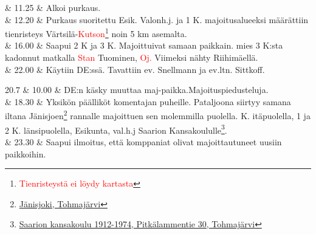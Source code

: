 \documentclass[11pt,a5paper,oneside]{book}
\begin{document}
& 11.25 & Alkoi purkaus. \\

& 12.20 & Purkaus suoritettu \newline Esik. Valonh.j. ja 1 K. majoitusalueeksi määrättiin tienristeys Värtsilä-\textcolor{red}{Kutson}\footnote{\textcolor{red}{Tienristeystä ei löydy kartasta}} noin 5 km asemalta. \\

& 16.00 & Saapui 2 K ja 3 K. Majoittuivat samaan paikkain. mies 3 K:sta kadonnut matkalla \textcolor{red}{Stan} Tuominen, \textcolor{red}{Oj.} Viimeksi nähty Riihimäellä. \newline\newline \\

& 22.00 & Käytiin DE:ssä. Tavattiin ev. Snellmann ja ev.ltn. Sittkoff. \\
\newpage

20.7 & 10.00 & DE:n käsky muuttaa maj-paikka.\newline Majoituspiedusteluja. \newline \\

& 18.30 & Yksikön päälliköt komentajan puheille. Pataljoona siirtyy samana iltana Jänisjoen\footnote{\href{https://www.google.fi/maps/place/J\%C3\%A4nisjoki/@62.1921584,30.5864508,14z/}{Jänisjoki, Tohmajärvi}} rannalle majoittuen sen molemmilla puolella. K. itäpuolella, 1 ja 2 K. länsipuolella, Esikunta, val.h.j Saarion Kansakoululle\footnote{\href{https://www.google.fi/maps/place/Pitk\%C3\%A4lammentie+30,+82600+Tohmaj\%C3\%A4rvi/}{Saarion kansakoulu 1912-1974, Pitkälammentie 30, Tohmajärvi}}. \newline \\

& 23.30 & Saapui ilmoitus, että komppaniat olivat majoittautuneet uusiin paikkoihin. \\

\taulustop

\end{document}
